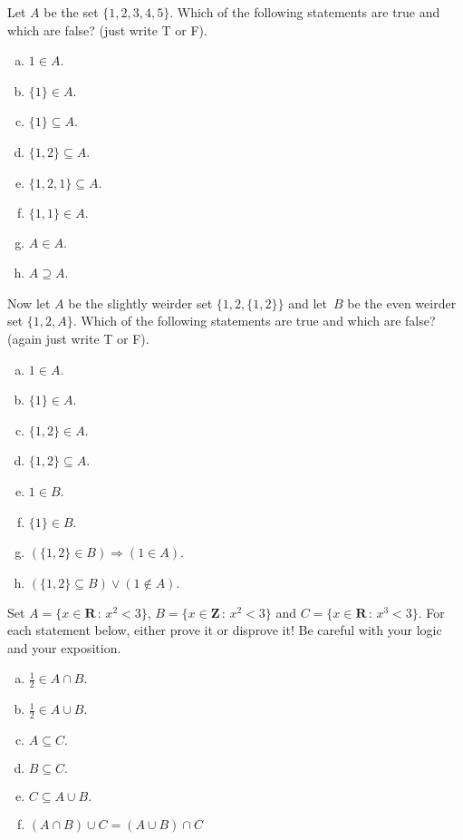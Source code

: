 \documentclass[10pt]{article}
\newcommand{\R}{\mathbf{R}}
\newcommand{\Z}{\mathbf{Z}}
\begin{document}
\medskip{} Let $A$ be the set $\{1,2,3,4,5\}$. Which of the following statements are true and which are false? (just write T or F).
\begin{multicols}{2}
\begin{enumerate}[(a)]
\item $1\in A$. 
\item $\{1\}\in A$.
\item $\{1\}\subseteq A$.
\item $\{1,2\}\subseteq A$.
\item $\{1,2,1\}\subseteq A.$
\item $\{1,1\}\in A.$
\item $A\in A$.
\item $A\supseteq A$.
\end{enumerate}
\end{multicols}
\medskip
{} Now let $A$ be the slightly weirder set $\{1,2,\{1,2\}\}$ and let~$B$ be the even weirder set $\{1,2,A\}$. Which of the following statements are true and which are false? (again just write T or F).
\begin{multicols}{2}
\begin{enumerate}[(a)]
\item $1\in A$. 
\item $\{1\}\in A$.
\item $\{1,2\}\in A$.
\item $\{1,2\}\subseteq A$.
\item $1\in B$.
\item $\{1\}\in B$.
\item $(\{1,2\}\in B)\Rightarrow(1\in A)$.
\item $(\{1,2\}\subseteq B)\vee(1\not\in A).$
\end{enumerate}
\end{multicols}
\medskip{} Set $A=\{x\in\R\,:\,x^2<3\}$, $B=\{x\in\Z\,:\,x^2<3\}$ and $C=\{x\in\R\,:\,x^3<3\}$. For each statement below, either prove it or disprove it! Be careful with your logic and your exposition.
\begin{multicols}{2}
\begin{enumerate}[(a)]
\item $\frac{1}{2}\in A\cap B.$
\item $\frac{1}{2}\in A\cup B.$
\item $A\subseteq C.$
\item $B\subseteq C.$
\item $C\subseteq A\cup B.$
\item $(A\cap B)\cup C=(A\cup B)\cap C$
\end{enumerate}
\end{multicols}
\end{document}
